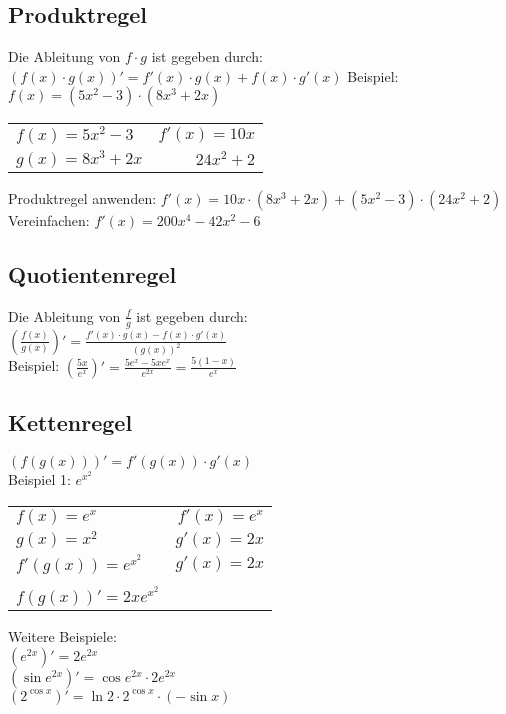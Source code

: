 \documentclass[a4paper, 11pt]{article}
\begin{document}
\subsection{Produktregel}
Die Ableitung von $f \cdot g$ ist gegeben durch: \newline
\newline $(f(x) \cdot g(x))' = f'(x) \cdot g(x) + f(x) \cdot g'(x)$\newline
\newline Beispiel: $f(x) = (5x^2 - 3) \cdot (8x^3+2x)$

\begin{tabular}{l r}
	$f(x) = 5x^2 - 3$ & $f'(x) = 10x$\\
	$g(x)=8x^3+2x$ & $24x^2 + 2$\\
\end{tabular} \newline
\newline Produktregel anwenden: 
\newline $f'(x)=10x \cdot (8x^3+2x) + (5x^2-3) \cdot (24x^2+2)$ \newline
\newline Vereinfachen: $f'(x) = 200x^4-42x^2-6$

\subsection{Quotientenregel}

Die Ableitung von $\frac{f}{g}$ ist gegeben durch: \\
\newline $(\frac{f(x)}{g(x)})' = \frac{f'(x) \cdot g(x) - f(x) \cdot
g'(x)}{(g(x))^2}$ \\

Beispiel: $(\frac{5x}{e^x})' = \frac{5e^x-5xe^x}{e^{2x}} = \frac{5(1-x)}{e^x}$

\subsection{Kettenregel}

$(f(g(x)))' = f'(g(x)) \cdot g'(x)$\\
\newline Beispiel 1: $e^{x^{2}}$\\ 
\begin{tabular}{l r}
	$f(x)=e^x$ & $f'(x)=e^x$\\
	$g(x)=x^2$ & $g'(x)=2x$\\
	$f'(g(x))=e^{x^{2}}$ & $g'(x)=2x$\\
	& \\
	$f(g(x))'=2xe^{x^{2}}$
\end{tabular} \newline
\newline Weitere Beispiele: \\
$(e^{2x})' = 2e^{2x}$\\
$(\sin{e^{2x}})' = \cos{e^{2x}} \cdot 2e^{2x}$\\
$(2^{\cos{x}})'=\ln{2} \cdot 2^{\cos{x}} \cdot (-\sin{x})$
\end{document}
